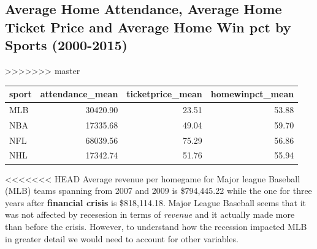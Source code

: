 \documentclass[man, fleqn, noextraspace,floatsintext]{apa6}
\newenvironment{Shaded}{\begin{snugshade}}{\end{snugshade}}
\newcommand{\DataTypeTok}[1]{\textcolor[rgb]{0.13,0.29,0.53}{#1}}
\newcommand{\DecValTok}[1]{\textcolor[rgb]{0.00,0.00,0.81}{#1}}
\newcommand{\KeywordTok}[1]{\textcolor[rgb]{0.13,0.29,0.53}{\textbf{#1}}}
\newcommand{\NormalTok}[1]{#1}
\newcommand{\OperatorTok}[1]{\textcolor[rgb]{0.81,0.36,0.00}{\textbf{#1}}}
\newcommand{\StringTok}[1]{\textcolor[rgb]{0.31,0.60,0.02}{#1}}
\begin{document}
\hypertarget{average-home-attendance-average-home-ticket-price-and-average-home-win-pct-by-sports-2000-2015}{%
\subsection{Average Home Attendance, Average Home Ticket Price and Average Home Win pct by Sports (2000-2015)}\label{average-home-attendance-average-home-ticket-price-and-average-home-win-pct-by-sports-2000-2015}}

\begin{Shaded}
\end{Shaded}
>>>>>>> master

\begin{tabular}{l|r|r|r}
\hline
sport & attendance\_mean & ticketprice\_mean & homewinpct\_mean\\
\hline
MLB & 30420.90 & 23.51 & 53.88\\
\hline
NBA & 17335.68 & 49.04 & 59.70\\
\hline
NFL & 68039.56 & 75.29 & 56.86\\
\hline
NHL & 17342.74 & 51.76 & 55.94\\
\hline
\end{tabular}

<<<<<<< HEAD
Average revenue per homegame for Major league Baseball (MLB) teams
spanning from 2007 and 2009 is \$794,445.22 while the one for three
years after \textbf{financial crisis} is \$818,114.18. Major League
Baseball seems that it was not affected by recesesion in terms of
\emph{revenue} and it actually made more than before the crisis.
However, to understand how the recession impacted MLB in greater detail
we would need to account for other variables.
\end{document}
